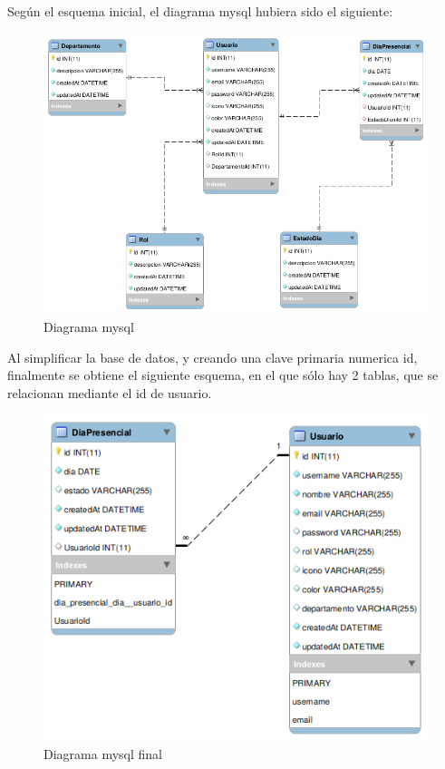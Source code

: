 \documentclass[11pt,spanish,listoffigures,listoftables]{tfgetsinf}
\begin{document}
Según el esquema inicial, el diagrama mysql hubiera sido el siguiente:
\begin{figure}[h!] %
   \includegraphics[scale=0.40]{img/EsquemaBBDD.png}
   \caption{Diagrama mysql}
   \label{fig:diagramaMysql}
 \end{figure}

 Al simplificar la base de datos, y creando una clave primaria numerica id, finalmente se obtiene el siguiente esquema, en el que sólo hay 2 tablas, que se relacionan mediante el id de usuario. 
 \begin{figure}[h!] %
  \includegraphics[scale=0.40]{img/nuevaBBDD.png}
  \caption{Diagrama mysql final}
  \label{fig:nuevodiagramaMysql}
\end{figure}
\clearpage 
\end{document}
